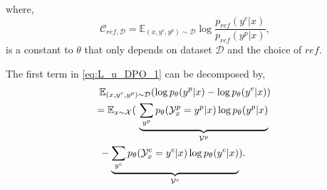 \noindent where,
%
\begin{equation}
    \mathcal C_{ref,\mathcal D} = \mathbb E_{(x,y^c,y^p)\sim \mathcal D} \log \frac{p_{ref}(y^c|x)}{p_{ref}(y^p|x)},
\end{equation}
%
is a constant to $\theta$ that only depends on dataset $\mathcal D$ and the choice of $ref$.

\vspace{2mm}
\noindent The first term in \eqref{eq:L_u_DPO_1} can be decomposed by,
%
\begin{align}
    &\mathbb E_{(x,y^c,y^p)\sim \mathcal D} (\log p_{\theta}(y^p|x) - \log p_{\theta}(y^c|x)) \notag \\
    &\!\!\!= \mathbb E_{x\sim\mathcal X} ( \,\,\underbrace{\sum_{y^p}  p_\theta(\mathcal Y^p_x=y^p|x) \log p_{\theta}(y^p|x)}_{\mathcal V^p} \notag \\
    &- \underbrace{\sum_{y^c}   p_\theta(\mathcal Y^c_x=y^c|x)  \log p_{\theta}(y^c|x)}_{\mathcal V^c} ). \label{eq:L_u_DPO_2}
\end{align}
%



